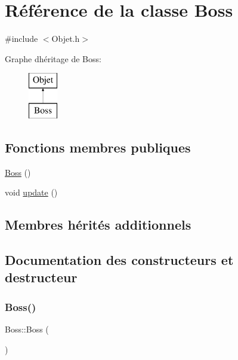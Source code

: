 \hypertarget{class_boss}{}\section{Référence de la classe Boss}
\label{class_boss}


{\ttfamily \#include $<$Objet.\+h$>$}

Graphe d\textquotesingle{}héritage de Boss\+:\begin{figure}[H]
\begin{center}
\leavevmode
\includegraphics[height=2.000000cm]{class_boss}
\end{center}
\end{figure}
\subsection*{Fonctions membres publiques}
\begin{DoxyCompactItemize}
\item 
\hyperlink{class_boss_af287739a9fe8cb9501795656d34f3018}{Boss} ()
\item 
void \hyperlink{class_boss_ab3b0e756ba923f88c8afea3ed3af552c}{update} ()
\end{DoxyCompactItemize}
\subsection*{Membres hérités additionnels}


\subsection{Documentation des constructeurs et destructeur}
\mbox{\label{class_boss_af287739a9fe8cb9501795656d34f3018}} 
\subsubsection{\texorpdfstring{Boss()}{Boss()}}
{\footnotesize\ttfamily Boss\+::\+Boss (\begin{DoxyParamCaption}{ }\end{DoxyParamCaption})\hspace{0.3cm}{\ttfamily [inline]}}



